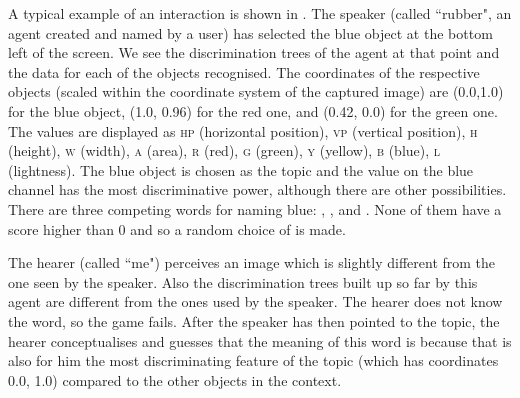 A typical example of an interaction is shown in . 
The speaker (called ``rubber", an agent created and named by a user) has selected the blue object at the bottom left 
of the screen. We see the discrimination trees of the agent at that point and the data for each of the objects 
recognised. The coordinates of the respective objects (scaled within the coordinate system of 
the captured image) are (0.0,1.0) for the blue object, (1.0, 0.96) for the red one, and (0.42, 0.0) for the green one. 
The values are displayed as \textsc{hp} (horizontal position), \textsc{vp} (vertical position), \textsc{h} (height), \textsc{w} (width), \textsc{a} (area), 
\textsc{r} (red), \textsc{g} (green), \textsc{y} (yellow), \textsc{b} (blue), \textsc{l} (lightness). 
The blue object is chosen as the topic and the value on the blue channel has the most discriminative power, although 
there are other possibilities. There are three competing words for naming blue: , , and . 
None of them have a score higher than 0 and so a random choice of  is made. 

The hearer (called ``me") perceives an image which is slightly different from 
the one seen by the speaker. Also the discrimination trees built up so far by this agent are different from the ones used
by the speaker. The hearer does not know the word, so the game fails. After the speaker has then pointed to the 
topic, the hearer conceptualises and guesses that the meaning of this word is  because that is also for him the most 
discriminating feature of the topic (which has coordinates 0.0, 1.0) compared to the other objects in the context. 


